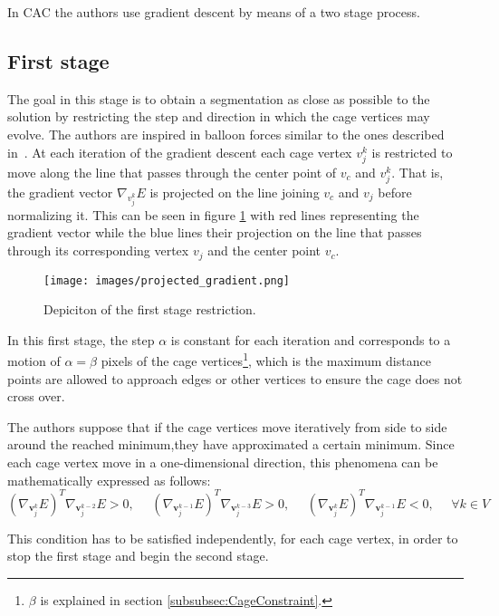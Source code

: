 In CAC the authors use gradient descent by means of a two stage process. 

\subsection*{First stage}
The goal in this stage is to obtain a segmentation as close as possible to
the solution by restricting the step and direction in which the cage vertices may
evolve. The authors are inspired in balloon forces similar to the ones described
in~\cite{Cohen1991}. At each iteration of the gradient descent each cage vertex $v_j^k$ is restricted to move along the line that passes through the center point of $v_c$ and $v_j^k$. That is, the gradient
vector $\nabla_{v_j^k} E$ is projected on the line joining
$v_c$ and $v_j$ before normalizing it. This can be seen in figure \ref{fig:projected_gradient} with red lines representing the gradient vector while the blue lines their projection on the line that passes through its corresponding vertex $v_j$ and the center point $v_c$.

\begin{figure}[h!]
	\centering
	{\texttt{[image: images/projected\_gradient.png]}}
	\caption{Depiciton of the first stage restriction.}
	\label{fig:projected_gradient}
\end{figure}

In this first stage, the step $\alpha$ is constant for each iteration
and corresponds to a motion of $\alpha=\beta$ pixels of the
cage vertices\footnote{$\beta$ is explained in section \ref{subsubsec:CageConstraint}.}, which is the maximum distance points are allowed to approach edges or other vertices to ensure the cage does not cross over. 

The authors suppose that if the cage vertices move iteratively from side to side around the reached minimum,they have approximated a certain minimum. Since each cage vertex move
in a one-dimensional direction, this phenomena can be mathematically
expressed as follows:
\begin{equation}\label{eq:condition_stage_1}
(\nabla_{\mathbf{v}_j^k} E)^T
\nabla_{\mathbf{v}_j^{k-2}} E > 0,\ \ \ \ \ \ (\nabla_{\mathbf{v}_j^{k-1}} E)^T
\nabla_{\mathbf{v}_j^{k-3}} E > 0,\ \ \ \ \ \ (\nabla_{\mathbf{v}_j^k} E)^T \nabla_{\mathbf{v}_j^{k-1}} E < 0,
\ \ \ \ \ \ \forall k \in V
\end{equation}

This condition has to be satisfied independently, for each cage vertex, in order to stop the first stage and begin the second stage.


